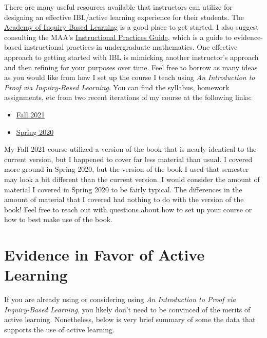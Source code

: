 \documentclass[11pt]{article}%
\newcommand{\blankline}{\pagebreak[2]\vspace{.5\baselineskip}}
\begin{document}
There are many useful resources available that instructors can utilize for designing an effective IBL/active learning experience for their students.  The \href{http://www.inquirybasedlearning.org}{Academy of Inquiry Based Learning} is a good place to get started.  I also suggest consulting the MAA's \href{https://www.maa.org/programs-and-communities/curriculum%20resources/instructional-practices-guide}{Instructional Practices Guide}, which is a guide to evidence-based instructional practices in undergraduate mathematics.  One effective approach to getting started with IBL is mimicking another instructor's approach and then refining for your purposes over time.  Feel free to borrow as many ideas as you would like from how I set up the course I teach using \emph{An Introduction to Proof via Inquiry-Based Learning}.  You can find the syllabus, homework assignments, etc from two recent iterations of my course at the following links:
\begin{itemize}
\item \href{http://danaernst.com/teaching/mat320f21/}{Fall 2021}
\item \href{http://danaernst.com/teaching/mat320s20/}{Spring 2020}
\end{itemize}
My Fall 2021 course utilized a version of the book that is nearly identical to the current version, but I happened to cover far less material than usual.  I covered more ground in Spring 2020, but the version of the book I used that semester may look a bit different than the current version.  I would consider the amount of material I covered in Spring 2020 to be fairly typical.  The differences in the amount of material that I covered had nothing to do with the version of the book!  Feel free to reach out with questions about how to set up your course or how to best make use of the book.


\section*{Evidence in Favor of Active Learning}

If you are already using or considering using \emph{An Introduction to Proof via Inquiry-Based Learning}, you likely don't need to be convinced of the merits of active learning.  Nonetheless, below is very brief summary of some the data that supports the use of active learning.

\blankline
\end{document}
